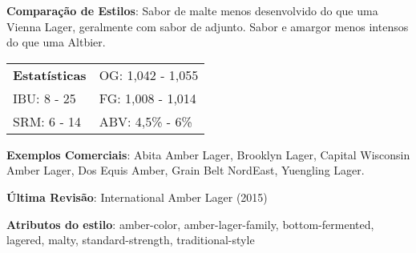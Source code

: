 \textbf{Comparação de Estilos}: Sabor de malte menos desenvolvido do que uma Vienna Lager, geralmente com sabor de adjunto. Sabor e amargor menos intensos do que uma Altbier.

\begin{tabular}{@{}p{35mm}p{35mm}@{}}
  \textbf{Estatísticas} & OG: 1,042 - 1,055 \\
  IBU: 8 - 25 & FG: 1,008 - 1,014 \\
  SRM: 6 - 14 & ABV: 4,5\% - 6\%
\end{tabular}

\textbf{Exemplos Comerciais}: Abita Amber Lager, Brooklyn Lager, Capital Wisconsin Amber Lager, Dos Equis Amber, Grain Belt NordEast, Yuengling Lager.

\textbf{Última Revisão}: International Amber Lager (2015)

\textbf{Atributos do estilo}: amber-color, amber-lager-family, bottom-fermented, lagered, malty, standard-strength, traditional-style